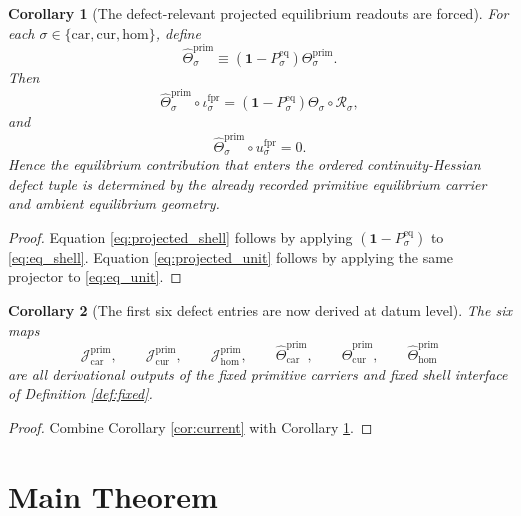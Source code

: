 \documentclass[11pt]{article}
\newcommand{\Car}{\mathrm{car}}
\newcommand{\Cur}{\mathrm{cur}}
\newcommand{\Hom}{\mathrm{hom}}
\newcommand{\ForPrimInc}[1]{\iota_{#1}^{\mathrm{fpr}}}
\newcommand{\ForPrimUnit}[1]{u_{#1}^{\mathrm{fpr}}}
\newcommand{\Reduction}[1]{\mathcal R_{#1}}
\newcommand{\ObsTheta}[1]{\Theta_{#1}}
\newcommand{\PrimCurrent}[1]{\mathcal J_{#1}^{\mathrm{prim}}}
\newcommand{\PrimTheta}[1]{\Theta_{#1}^{\mathrm{prim}}}
\newcommand{\EqProj}[1]{P_{#1}^{\mathrm{eq}}}
\newcommand{\ProjectedTheta}[1]{\widehat{\Theta}_{#1}^{\mathrm{prim}}}
\newtheorem{corollary}{Corollary}
\begin{document}
\begin{corollary}[The defect-relevant projected equilibrium readouts are forced]
\label{cor:projected}
For each \(\sigma\in\{\Car,\Cur,\Hom\}\), define
\begin{equation}
\ProjectedTheta{\sigma}
\equiv
(\mathbf 1-\EqProj{\sigma})\PrimTheta{\sigma}.
\label{eq:projectedtheta}
\end{equation}
Then
\begin{equation}
\ProjectedTheta{\sigma}\circ \ForPrimInc{\sigma}
=
(\mathbf 1-\EqProj{\sigma})\ObsTheta{\sigma}\circ \Reduction{\sigma},
\label{eq:projected_shell}
\end{equation}
and
\begin{equation}
\ProjectedTheta{\sigma}\circ \ForPrimUnit{\sigma}=0.
\label{eq:projected_unit}
\end{equation}
Hence the equilibrium contribution that enters the ordered continuity-Hessian defect tuple is determined by the already recorded primitive equilibrium carrier and ambient equilibrium geometry.
\end{corollary}

\begin{proof}
Equation \eqref{eq:projected_shell} follows by applying \((\mathbf 1-\EqProj{\sigma})\) to \eqref{eq:eq_shell}. Equation \eqref{eq:projected_unit} follows by applying the same projector to \eqref{eq:eq_unit}.
\end{proof}

\begin{corollary}[The first six defect entries are now derived at datum level]
\label{cor:six}
The six maps
\[
\PrimCurrent{\Car},\qquad
\PrimCurrent{\Cur},\qquad
\PrimCurrent{\Hom},\qquad
\ProjectedTheta{\Car},\qquad
\ProjectedTheta{\Cur},\qquad
\ProjectedTheta{\Hom}
\]
are all derivational outputs of the fixed primitive carriers and fixed shell interface of Definition \ref{def:fixed}.
\end{corollary}

\begin{proof}
Combine Corollary \ref{cor:current} with Corollary \ref{cor:projected}.
\end{proof}

\section{Main Theorem}
\end{document}
